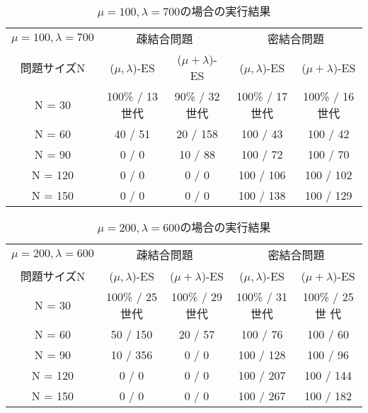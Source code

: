 \documentclass[a4j]{jarticle}
\begin{document}
\begin{table}[htb]
 \begin{center}
  \begin{tabular}[tb]{|c||c|c||c|c|} \hline
   $\mu = 100, \lambda = 700$& \multicolumn{2}{c||}{疎結合問題} &
   \multicolumn{2}{c|}{密結合問題} \\ \cline{2-5}
   問題サイズN& ($\mu, \lambda$)-ES& ($\mu + \lambda$)-ES& ($\mu, \lambda$)-ES&
   ($\mu + \lambda$)-ES \\ \hline \hline
   N = 30& 100\% / 13世代& 90\% / 32世代& 100\% / 17世代& 100\% / 16世代\\ \hline
   N = 60& 40 / 51&20 / 158 & 100 / 43& 100 / 42\\ \hline
   N = 90& 0 / 0&10 / 88 & 100 / 72& 100 / 70\\ \hline
   N = 120& 0 / 0&0 / 0 & 100 / 106& 100 / 102\\ \hline
   N = 150& 0 / 0& 0 / 0 & 100 / 138& 100 / 129\\ \hline
  \end{tabular}
  \caption{$\mu = 100, \lambda = 700$の場合の実行結果}
  \label{17}
 \end{center}
\end{table}

\begin{table}[htb]
 \begin{center}
  \begin{tabular}[tb]{|c||c|c||c|c|} \hline
   $\mu = 200, \lambda = 600$& \multicolumn{2}{c||}{疎結合問題} &
   \multicolumn{2}{c|}{密結合問題} \\ \cline{2-5}
   問題サイズN& ($\mu, \lambda$)-ES& ($\mu + \lambda$)-ES& ($\mu, \lambda$)-ES&
   ($\mu + \lambda$)-ES \\ \hline \hline
   N = 30& 100\% / 25世代& 100\% / 29世代& 100\% / 31世代& 100\% / 25世
   代\\ \hline
   N = 60& 50 / 150& 20 / 57& 100 / 76& 100 / 60\\ \hline
   N = 90& 10 / 356&0 / 0 & 100 / 128& 100 / 96\\ \hline
   N = 120& 0 / 0&0 / 0 & 100 / 207& 100 / 144\\ \hline
   N = 150& 0 / 0&0 / 0 & 100 / 267& 100 / 182\\ \hline
  \end{tabular}
  \caption{$\mu = 200, \lambda = 600$の場合の実行結果}
  \label{26}
 \end{center}
\end{table}
\end{document}
